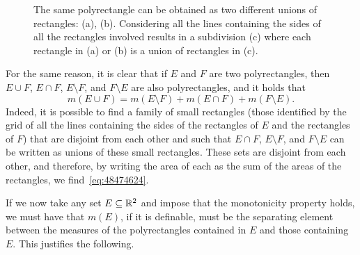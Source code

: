 \begin{figure}
  \hfill
  \subcaptionbox{}
  {}
  \hfill
  \subcaptionbox{}
  {}
  \hfill
  \subcaptionbox{}
  {}
  \hfill\mbox{}
  \caption{The same polyrectangle can be obtained as two different unions of rectangles: (a), (b). Considering all the lines containing the sides of all the rectangles involved results in a subdivision (c) where each rectangle in (a) or (b) is a union of rectangles in (c).}
\end{figure}

For the same reason, it is clear that if $E$ and $F$ are two polyrectangles,
then $E\cup F$, $E \cap F$, $E\setminus F$, and $F\setminus E$ are also
polyrectangles, and it holds that
\begin{equation}\label{eq:48474624}
  m(E \cup F) = m(E\setminus F) + m(E\cap F) + m(F\setminus E).
\end{equation}
Indeed, it is possible to find a family of small rectangles (those identified by
the grid of all the lines containing the sides of the rectangles of $E$ and the
rectangles of $F$) that are disjoint from each other and such that $E\cap F$,
$E\setminus F$, and $F\setminus E$ can be written as unions of these small
rectangles. These sets are disjoint from each other, and therefore, by writing
the area of each as the sum of the areas of the rectangles, we
find~\eqref{eq:48474624}.

If we now take any set $E\subseteq {\mathbb R}^2$ and impose that the monotonicity
property holds, we must have that $m(E)$, if it is definable, must be the
separating element between the measures of the polyrectangles contained in $E$
and those containing $E$. This justifies the following.

